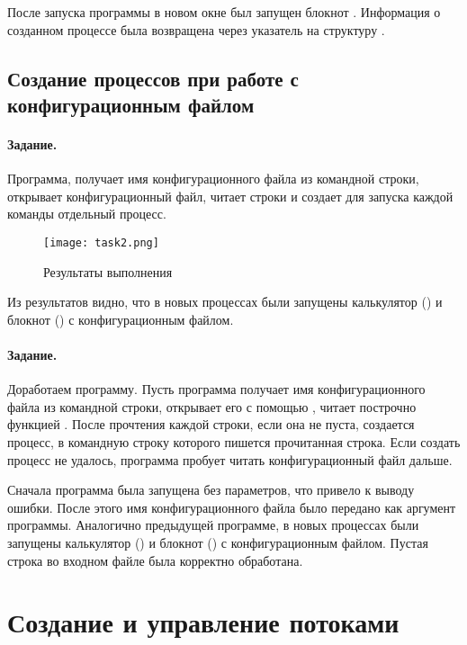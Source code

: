 После запуска программы в новом окне был запущен блокнот . Информация о созданном процессе была возвращена через указатель на структуру .

\subsection{Создание процессов при работе с конфигурационным файлом}

\paragraph{Задание.} Программа, получает имя конфигурационного файла из командной строки, открывает конфигурационный файл, читает строки и создает для запуска каждой команды отдельный процесс.


\begin{figure}[H]
	\texttt{[image: task2.png]}
	\caption{Результаты выполнения }
\end{figure}

Из результатов видно, что в новых процессах были запущены калькулятор () и блокнот () с конфигурационным файлом.

\paragraph{Задание.} Доработаем программу. Пусть программа получает имя конфигурационного файла из командной строки, открывает его с помощью , читает построчно функцией . После прочтения каждой строки, если она не пуста, создается процесс, в командную строку которого пишется прочитанная строка. Если создать процесс не удалось, программа пробует читать конфигурационный файл дальше.


Сначала программа была запущена без параметров, что привело к выводу ошибки. После этого имя конфигурационного файла было передано как аргумент программы. Аналогично предыдущей программе, в новых процессах были запущены калькулятор () и блокнот () с конфигурационным файлом. Пустая строка во входном файле была корректно обработана.

\newpage

\section{Создание и управление потоками}

